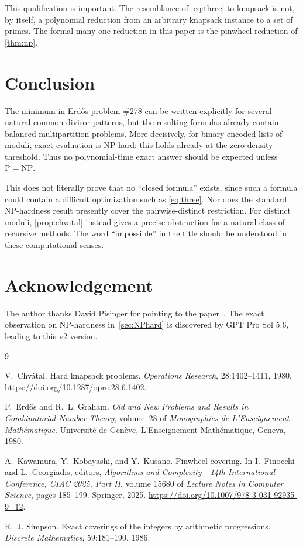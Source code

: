 \documentclass[a4paper,11pt]{article}
\begin{document}
This qualification is important.  The resemblance of \eqref{eq:three} to
knapsack is not, by itself, a polynomial reduction from an arbitrary knapsack
instance to a set of primes.  The formal many-one reduction in this paper is
the pinwheel reduction of \cref{thm:np}.

\section{Conclusion}

The minimum in Erd\H{o}s problem \#278 can be written explicitly for several
natural common-divisor patterns, but the resulting formulas already contain
balanced multipartition problems.  More decisively, for binary-encoded lists
of moduli, exact evaluation is NP-hard: this holds already at the zero-density
threshold.  Thus no polynomial-time exact answer should be expected unless
$\mathrm P=\mathrm{NP}$.

This does not literally prove that no ``closed formula'' exists, since such a
formula could contain a difficult optimization such as \eqref{eq:three}.
Nor does the standard NP-hardness result presently cover the pairwise-distinct
restriction.  For distinct moduli, \cref{prop:chvatal} instead gives a precise
obstruction for a natural class of recursive methods.  The word
``impossible'' in the title should be understood in these computational senses.

\section*{Acknowledgement}

The author thanks David Pisinger for pointing to the paper~\cite{Chvatal80}. The exact observation on NP-hardness in~\cref{sec:NPhard} is discovered by GPT Pro Sol 5.6, leading to this v2 version. 

\begin{thebibliography}{9}

V.~Chv\'atal.
\newblock Hard knapsack problems.
\newblock \emph{Operations Research}, 28:1402--1411, 1980.
\newblock \url{https://doi.org/10.1287/opre.28.6.1402}.

P.~Erd{\H{o}}s and R.~L. Graham.
\newblock \emph{Old and New Problems and Results in Combinatorial Number
Theory}, volume~28 of \emph{Monographies de L'Enseignement Math\'ematique}.
\newblock Universit\'e de Gen\`eve, L'Enseignement Math\'ematique, Geneva,
1980.

A.~Kawamura, Y.~Kobayashi, and Y.~Kusano.
\newblock Pinwheel covering.
\newblock In I.~Finocchi and L.~Georgiadis, editors, \emph{Algorithms and
Complexity---14th International Conference, CIAC 2025, Part II}, volume 15680
of \emph{Lecture Notes in Computer Science}, pages 185--199. Springer, 2025.
\newblock \url{https://doi.org/10.1007/978-3-031-92935-9_12}.

R.~J. Simpson.
\newblock Exact coverings of the integers by arithmetic progressions.
\newblock \emph{Discrete Mathematics}, 59:181--190, 1986.

\end{thebibliography}
\end{document}
